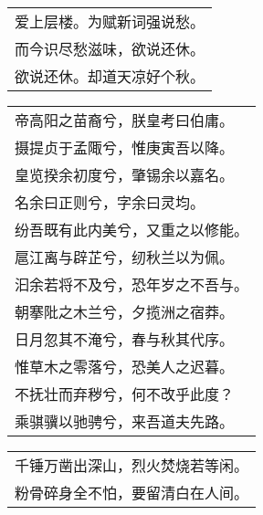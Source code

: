 \nopagebreak%
\nopagebreak%
\noindent\begin{minipage}{\linewidth}
  \vskip-3pt\begin{table}[H]
    \centering
    \begin{tabular}{@{}l@{}}
爱上层楼。为赋新词强说愁。\\
而今识尽愁滋味，欲说还休。\\
欲说还休。却道天凉好个秋。
    \end{tabular}
  \end{table}
\end{minipage}
\vspace{1cm}


\nopagebreak%
\nopagebreak%
\noindent\begin{minipage}{\linewidth}
  \vskip-3pt\begin{table}[H]
    \centering
    \begin{tabular}{@{}l@{}}
帝高阳之苗裔兮，朕皇考曰伯庸。\\
摄提贞于孟陬兮，惟庚寅吾以降。\\
皇览揆余初度兮，肇锡余以嘉名。\\
名余曰正则兮，字余曰灵均。\\
纷吾既有此内美兮，又重之以修能。\\
扈江离与辟芷兮，纫秋兰以为佩。\\
汩余若将不及兮，恐年岁之不吾与。\\
朝搴阰之木兰兮，夕揽洲之宿莽。\\
日月忽其不淹兮，春与秋其代序。\\
惟草木之零落兮，恐美人之迟暮。\\
不抚壮而弃秽兮，何不改乎此度？\\
乘骐骥以驰骋兮，来吾道夫先路。
    \end{tabular}
  \end{table}
\end{minipage}
\vspace{1cm}


\nopagebreak%
\nopagebreak%
\noindent\begin{minipage}{\linewidth}
  \vskip-3pt\begin{table}[H]
    \centering
    \begin{tabular}{@{}l@{}}
千锤万凿出深山，烈火焚烧若等闲。\\
粉骨碎身全不怕，要留清白在人间。
    \end{tabular}
  \end{table}
\end{minipage}
\vspace{1cm}


